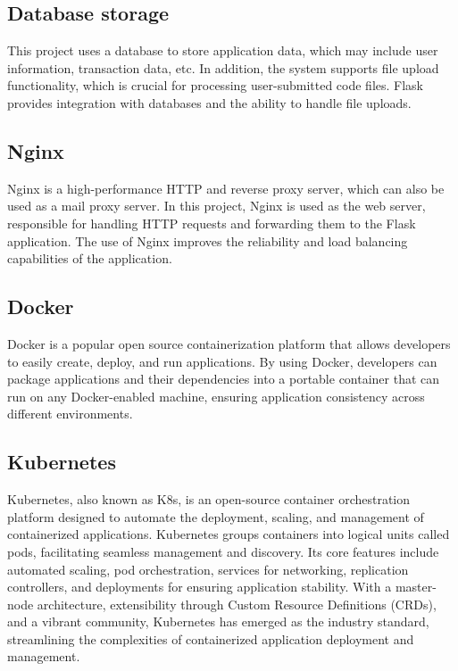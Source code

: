 \documentclass[journal]{IEEEtran}
\begin{document}
\subsection{Database storage}
This project uses a database to store application data, which may include user information, transaction data, etc. In addition, the system supports file upload functionality, which is crucial for processing user-submitted code files. Flask provides integration with databases and the ability to handle file uploads.

\subsection{Nginx}
Nginx is a high-performance HTTP and reverse proxy server, which can also be used as a mail proxy server. In this project, Nginx is used as the web server, responsible for handling HTTP requests and forwarding them to the Flask application. The use of Nginx improves the reliability and load balancing capabilities of the application.

\subsection{Docker}
Docker is a popular open source containerization platform that allows developers to easily create, deploy, and run applications. By using Docker, developers can package applications and their dependencies into a portable container that can run on any Docker-enabled machine, ensuring application consistency across different environments.

\subsection{Kubernetes}
Kubernetes, also known as K8s, is an open-source container orchestration platform designed to automate the deployment, scaling, and management of containerized applications.  Kubernetes groups containers into logical units called pods, facilitating seamless management and discovery. Its core features include automated scaling, pod orchestration, services for networking, replication controllers, and deployments for ensuring application stability. With a master-node architecture, extensibility through Custom Resource Definitions (CRDs), and a vibrant community, Kubernetes has emerged as the industry standard, streamlining the complexities of containerized application deployment and management.
\end{document}
